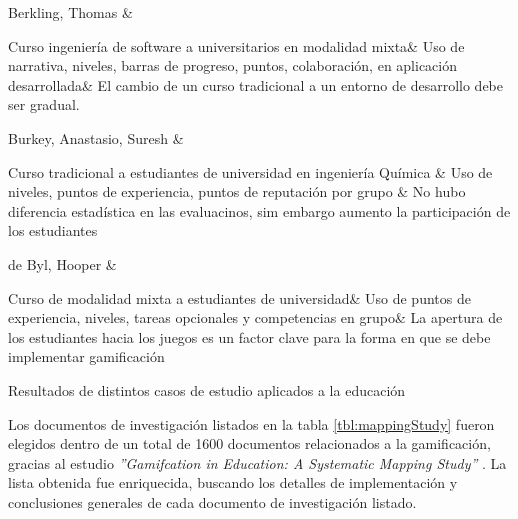 {        Berkling, Thomas \cite{gamificationFailure} &

            Curso ingeniería de software a universitarios en modalidad mixta&
            Uso de narrativa, niveles, barras de progreso, puntos, colaboración, en aplicación desarrollada&
            El cambio de un curso tradicional a un entorno de desarrollo debe ser gradual.\\\hline


        Burkey, Anastasio, Suresh \cite{gamificationChemical} &

            Curso tradicional a estudiantes de universidad en ingeniería Química &
            Uso de niveles, puntos de experiencia, puntos de reputación por grupo &
            No hubo diferencia estadística en las evaluacinos, sim embargo aumento la participación de los estudiantes\\\hline


        de Byl, Hooper \cite{gamifiedLearningKeyAttributes} &   %

            Curso de modalidad mixta a estudiantes de universidad&
            Uso de puntos de experiencia, niveles, tareas opcionales y competencias en grupo&
            La apertura de los estudiantes hacia los juegos es un factor clave para la forma en que se debe implementar gamificación\\\hline



    }{Resultados de distintos casos de estudio aplicados a la educación}

\noindent Los documentos de investigación listados en la tabla \ref{tbl:mappingStudy} fueron elegidos dentro de un total de 1600 documentos relacionados a la gamificación, gracias al estudio {\em ''Gamifcation in Education: A Systematic Mapping Study''} \cite{mappingStudy}. La lista obtenida fue enriquecida, buscando los detalles de implementación y conclusiones generales de cada documento de investigación listado.

